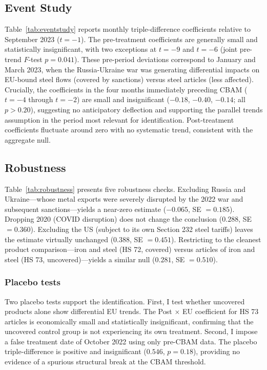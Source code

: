 \documentclass[12pt]{article}
\begin{document}
\subsection{Event Study}

Table~\ref{tab:eventstudy} reports monthly triple-difference coefficients relative to September 2023 ($t = -1$). The pre-treatment coefficients are generally small and statistically insignificant, with two exceptions at $t = -9$ and $t = -6$ (joint pre-trend $F$-test $p = 0.041$). These pre-period deviations correspond to January and March 2023, when the Russia-Ukraine war was generating differential impacts on EU-bound steel flows (covered by sanctions) versus steel articles (less affected). Crucially, the coefficients in the four months immediately preceding CBAM ($t = -4$ through $t = -2$) are small and insignificant ($-0.18$, $-0.40$, $-0.14$; all $p > 0.20$), suggesting no anticipatory deflection and supporting the parallel trends assumption in the period most relevant for identification. Post-treatment coefficients fluctuate around zero with no systematic trend, consistent with the aggregate null.

\subsection{Robustness}

Table~\ref{tab:robustness} presents five robustness checks. Excluding Russia and Ukraine---whose metal exports were severely disrupted by the 2022 war and subsequent sanctions---yields a near-zero estimate ($-0.065$, SE $= 0.185$). Dropping 2020 (COVID disruption) does not change the conclusion ($0.288$, SE $= 0.360$). Excluding the US (subject to its own Section 232 steel tariffs) leaves the estimate virtually unchanged ($0.388$, SE $= 0.451$). Restricting to the cleanest product comparison---iron and steel (HS 72, covered) versus articles of iron and steel (HS 73, uncovered)---yields a similar null ($0.281$, SE $= 0.510$).

\subsubsection*{Placebo tests} Two placebo tests support the identification. First, I test whether uncovered products alone show differential EU trends. The Post $\times$ EU coefficient for HS 73 articles is economically small and statistically insignificant, confirming that the uncovered control group is not experiencing its own treatment. Second, I impose a false treatment date of October 2022 using only pre-CBAM data. The placebo triple-difference is positive and insignificant ($0.546$, $p = 0.18$), providing no evidence of a spurious structural break at the CBAM threshold.
\end{document}
